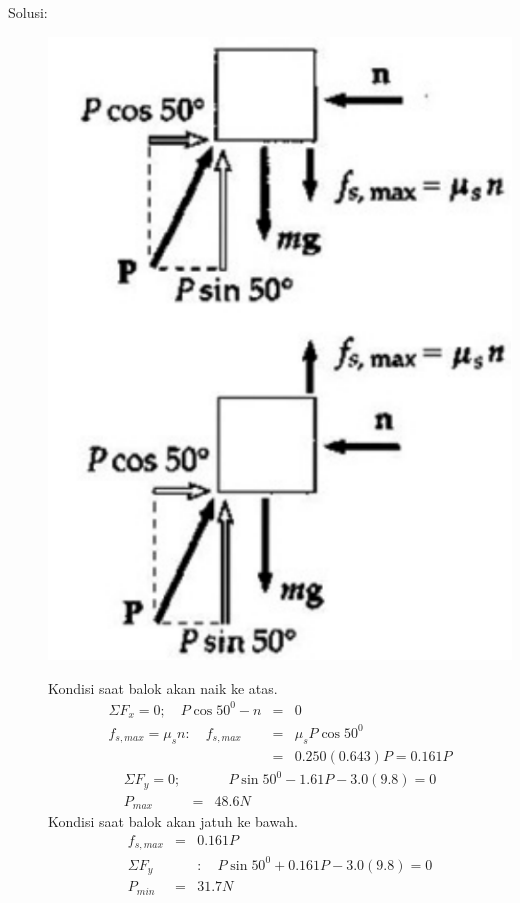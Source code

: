 \begin{description}
    \item[Solusi:]
        \mbox{}
\begin{center}
\includegraphics [scale=0.4]{./latex/eps/1_5_14_image_2-eps-converted-to.pdf}
\end{center}

Kondisi saat balok akan naik ke atas. \\
\begin{eqnarray*}
\Sigma F_{x}=0 ;\quad P\cos 50^{0}-n&=&0 \\
f_{s,max}=\mu_{s}n: \quad f_{s,max}&=&\mu_{s} P \cos 50^{0} \\
&=& 0.250(0.643)P=0.161P
\end{eqnarray*}
\begin{eqnarray*}
\Sigma F_{y}=0;& &\quad P\sin 50^{0}-1.61P-3.0(9.8)=0 \\
P_{max}&=&48.6 N
\end{eqnarray*}
Kondisi saat balok akan jatuh ke bawah. \\
\begin{eqnarray*}
f_{s,max}&=&0.161P  \\
\Sigma F_{y}& &:\quad P\sin50^{0}+0.161P-3.0(9.8)=0 \\
P_{min}&=&31.7 N
\end{eqnarray*} 

\end{description}
